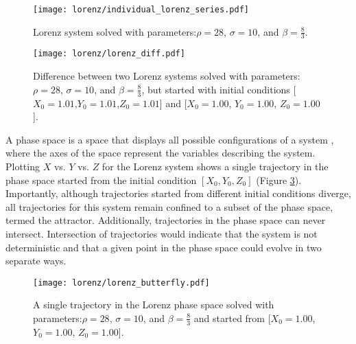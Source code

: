 \begin{figure}[htbp]  %
   \centering
   \texttt{[image: lorenz/individual\_lorenz\_series.pdf]} 
   \caption{Lorenz system solved with parameters:$\rho=28$, $\sigma=10$, and $\beta=\frac{8}{3}$. }
   \label{individual_lorenz_sols}
\end{figure}


\begin{figure}[htbp]  %
   \centering
   \texttt{[image: lorenz/lorenz\_diff.pdf]} 
   \caption{Difference between two Lorenz systems solved with parameters:$\rho=28$, $\sigma=10$, and $\beta=\frac{8}{3}$, but started with initial conditions [$X_0 = 1.01$,$Y_0= 1.01$,$Z_0= 1.01$] and [$X_0 = 1.00$, $Y_0= 1.00$, $Z_0= 1.00$]. }
   \label{lorenz_diff}
\end{figure}

A phase space is a space that displays all possible configurations of a system \cite{nonlinear_book}, where the axes of the space represent the variables describing the system. Plotting $X$ vs. $Y$ vs. $Z$ for the Lorenz system shows a single trajectory in the phase space started from the initial condition $[X_0,Y_0,Z_0]$ (Figure \ref{lorenz_butterfly}). Importantly, although trajectories started from different initial conditions diverge, all trajectories for this system remain confined to a subset of the phase space, termed the attractor.  Additionally, trajectories in the phase space can never intersect. Intersection of trajectories would indicate that the system is not deterministic and that a given point in the phase space could evolve in two separate ways. 

\begin{figure}[htbp]  %
   \centering
   \texttt{[image: lorenz/lorenz\_butterfly.pdf]} 
   \caption{A single trajectory in the Lorenz phase space solved with parameters:$\rho=28$, $\sigma=10$, and $\beta=\frac{8}{3}$ and started from [$X_0 = 1.00$, $Y_0= 1.00$, $Z_0= 1.00$]. }
   \label{lorenz_butterfly}
\end{figure}


